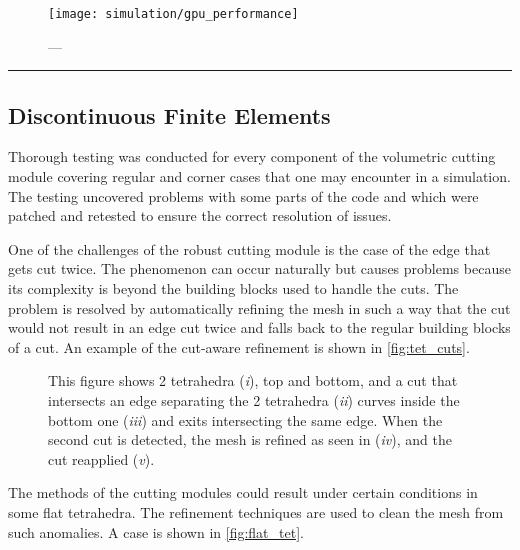 \begin{figure}
  \centering%
	\texttt{[image: simulation/gpu\_performance]}
	\caption{---}\label{fig:gpu_performance}
\end{figure}

\hrule%

\subsection{Discontinuous Finite Elements}
Thorough testing was conducted for every component of the volumetric cutting module covering regular and corner cases that one may encounter in a simulation. The testing uncovered problems with some parts of the code and which were patched and retested to ensure the correct resolution of issues.

One of the challenges of the robust cutting module is the case of the edge that gets cut twice. The phenomenon can occur naturally but causes problems because its complexity is beyond the building blocks used to handle the cuts. The problem is resolved by automatically refining the mesh in such a way that the cut would not result in an edge cut twice and falls back to the regular building blocks of a cut. An example of the cut-aware refinement is shown in \autoref{fig:tet_cuts}.

\begin{figure}
  \centering%
  \hfill%
  \hfill%
  \hfill%
  \hfill%
  \caption{This figure shows 2 tetrahedra (\emph{i}), top and bottom, and a cut that intersects an edge separating the 2 tetrahedra (\emph{ii}) curves inside the bottom one (\emph{iii}) and exits intersecting the same edge. When the second cut is detected, the mesh is refined as seen in (\emph{iv}), and the cut reapplied (\emph{v}).}\label{fig:tet_cuts}
\end{figure}

The methods of the cutting modules could result under certain conditions in some flat tetrahedra. The refinement techniques are used to clean the mesh from such anomalies. A case is shown in \autoref{fig:flat_tet}.


